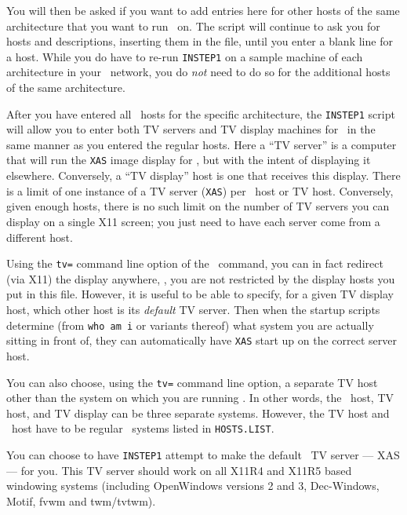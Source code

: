 You will then be asked if you want to add entries here for other hosts
of the same architecture that you want to run \AIPS\ on.  The script
will continue to ask you for hosts and descriptions, inserting them in
the file, until you enter a blank line for a host.  While you do have
to re-run {\tt INSTEP1} on a sample machine of each architecture in
your \AIPS\ network, you do {\it not\/} need to do so for the
additional hosts of the same architecture.

After you have entered all \AIPS\ hosts for the specific architecture,
the {\tt INSTEP1} script will allow you to enter both TV servers and TV
display machines for \AIPS\ in the same manner as you entered the
regular hosts.  Here a ``TV server'' is a computer that will run the
{\tt XAS} image display for \AIPS, but with the intent of displaying it
elsewhere.  Conversely, a ``TV display'' host is one that receives this
display.  There is a limit of one instance of a TV server ({\tt XAS}) per
\AIPS\ host or TV host.  Conversely, given enough hosts, there is no such
limit on the number of TV servers you can display on a single X11 screen;
you just need to have each server come from a different host.

Using the {\tt tv=} command line option of the \ttaips\ command, you can
in fact redirect (via X11) the display anywhere, \ie, you are not
restricted by the display hosts you put in this file.  However, it is
useful to be able to specify, for a given TV display host, which other
host is its {\it default\/} TV server.  Then when the startup scripts
determine (from {\tt who am i} or variants thereof) what system you are
actually sitting in front of, they can automatically have {\tt XAS} start
up on the correct server host.

You can also choose, using the {\tt tv=} command line option, a separate
TV host other than the system on which you are running \ttaips.  In
other words, the \ttaips\ host, TV host, and TV display can be three
separate systems.  However, the TV host and \ttaips\ host have to be
regular \AIPS\ systems listed in {\tt HOSTS.LIST}.

\medskip


You can choose to have {\tt INSTEP1} attempt to make the default
\AIPS\ TV server --- XAS --- for you.  This TV server should work on
all X11R4 and X11R5 based windowing systems (including OpenWindows
versions 2 and 3, Dec-Windows, Motif, fvwm and twm/tvtwm).

